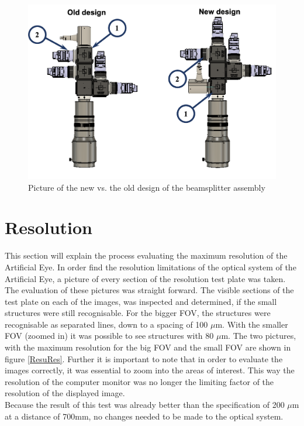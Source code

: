 \begin{figure}
\begin{center}
\includegraphics[width=12cm]{Pictures/NewAssembly}
\caption[Picture of the new vs. the old design of the beamsplitter assembly]{Picture of the new vs. the old design of the beamsplitter assembly}
\label{NewAssembly}
\end{center}
\end{figure}








\section{Resolution}
This section will explain the process evaluating the maximum resolution of the Artificial Eye. In order find the resolution limitations of the optical system of the Artificial Eye, a picture of every section of the resolution test plate was taken. The evaluation of these pictures was straight forward. The visible sections of the test plate on each of the images, was inspected and determined, if the small structures were still recognisable. For the bigger FOV, the structures were recognisable as separated lines, down to a spacing of 100 $\mu$m. With the smaller FOV (zoomed in) it was possible to see structures with 80 $\mu$m. The two pictures, with the maximum resolution for the big FOV and the small FOV are shown in figure \ref{ResuRes}. Further it is important to note that in order to evaluate the images correctly, it was essential to zoom into the areas of interest. This way the resolution of the computer monitor was no longer the limiting factor of the resolution of the displayed image.\\
Because the result of this test was already better than the specification of 200 $\mu$m at a distance of 700mm, no changes needed to be made to the optical system.

